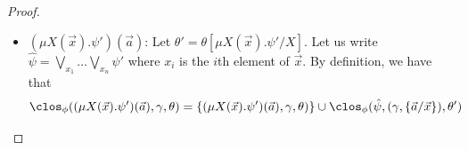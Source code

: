 \begin{proof}
\begin{enumerate}
\begin{itemize}
						\begin{align*}
				\orb[\Ncal](\clos_\phi(\psi, \theta)) 
				&= \bigcup\nolimits_{a \in \Ncal} \orb[\Ncal](\clos_\phi(\psi',(\gamma, \{a/x\}), \theta)) 
				\\
								&\quad\cup \orb[\Ncal]\left(\bigcup\nolimits_{a \notin \Ncal} (a\ b) \cdot\clos_\phi(\psi',(\gamma, \{a/x\}), \theta)\right)
				\cup\{(\psi, \gamma,\theta)\} 
			\end{align*}
			and hence
			\begin{align*}
				|\orb[\Ncal](\clos_\phi(\psi, \gamma,\theta)) |
																&\leq \sum\nolimits_{a \in \Ncal} |\orb[\Ncal](\clos_\phi(\psi',(\gamma, \{a/x\}), \theta))| \\
				&\quad + |\orb[\Ncal \cup \{b\}](\clos_\phi(\psi',(\gamma, \{ a /  x\}), \theta))|+1\\
				&\overset{\text{IH}}{\leq}
				\sum\nolimits_{a \in \Ncal} |\psi'|\cdot m'(\psi',(\gamma, \{a/x\}),\theta) \\
				&\quad + |\psi'|\cdot m'(\psi',(\gamma, \{ a /  x\})\theta)+1
			\end{align*}
			For $a \in \Ncal$, then $m'(\psi',(\gamma, \{a/x\}),\theta) = (|\Ncal| + \|\psi\| - 1)!/|\Ncal|! = m'(\psi,\gamma,\theta)/(|\Ncal|+\|\psi\|)$. 
			For $b \notin \supp(\psi',\gamma,\theta)$, then $m'(\psi',(\gamma, \{\vec a / \vec x\}),\theta) = (|\Ncal| + \|\psi\|) / (|\Ncal| + 1)! = m'(\psi)/(|\Ncal| + 1)$.
			Thus, we obtain:
			\begin{align*}
				|\orb[\Ncal](\clos_\phi(\psi,\gamma, \theta)| 
				&\le 
				\sum\nolimits_{a \in \Ncal} |\psi'|\cdot m'(\psi,(\gamma, \{a/x\}),\theta)/(|\Ncal|+1)\\
				&\quad + |\psi'|\cdot m'(\psi,\gamma,\theta)/(|\Ncal|+1)+1
				\\
				&=|\psi'|\cdot m'(\psi,\gamma,\theta)/(|\Ncal|+1)\cdot (|\Ncal|+1)+1 
				\\
				&=|\psi'|\cdot m'(\psi,\gamma,\theta)+1
				\leq |\psi|\cdot m'(\psi,\gamma,\theta)
			\end{align*}
			A similar argument can be shown for $\bigwedge\nolimits_x \psi'$ and $\fresh{x} \psi'$.
						\item $(\mu X(\vec x).\psi')(\vec a)$: 
			Let $\theta' = \theta[\mu X(\vec x).\psi' / X]$.
									Let us write $\hat \psi = \bigvee\nolimits_{x_1}\dots\bigvee\nolimits_{x_n}\psi'$ where $x_i$ is the $i$th element of $\vec x$.
			By definition, we have that
			\[
			\clos_\phi((\mu X(\vec x).\psi')(\vec a), \gamma, \theta) = \{(\mu X(\vec x).\psi')(\vec a), \gamma, \theta)\} \cup \clos_\phi(\hat \psi, (\gamma, \{\vec a / \vec x\}), \theta')
\]
\end{itemize}
\end{enumerate}
\end{proof}
